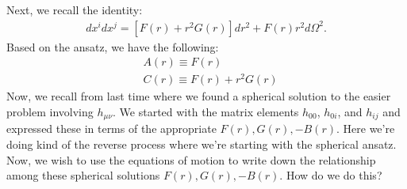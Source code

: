 \documentclass{book}
\theoremstyle{definition}
\newcommand{\nn}{\nonumber}
\begin{document}
Next, we recall the identity:
\begin{align}
[F(r)\delta_{ij} + G(r)x_ix_j]dx^idx^j = [F(r) + r^2 G(r)]dr^2 + F(r)r^2d\Omega^2.
\end{align}
Based on the ansatz, we have the following:
\begin{align}
&A(r) \equiv F(r)\nn\\
&C(r) \equiv F(r) + r^2 G(r)
\end{align}
Now, we recall from last time where we found a spherical solution to the easier problem involving $h_{\mu\nu}$. We started with the matrix elements $h_{00}$, $h_{0i}$, and $h_{ij}$ and expressed these in terms of the appropriate $F(r), G(r), -B(r)$. Here we're doing kind of the reverse process where we're starting with the spherical ansatz. Now, we wish to use the equations of motion to write down the relationship among these spherical solutions $F(r), G(r), -B(r)$. How do we do this?\\
\end{document}
